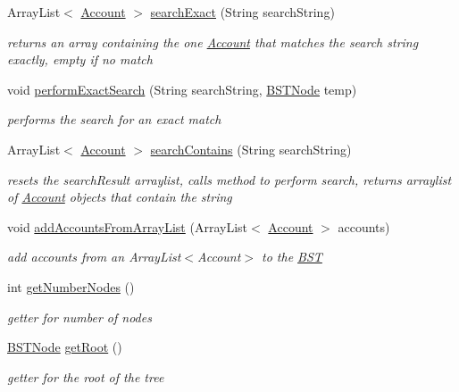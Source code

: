 \begin{DoxyCompactItemize}
Array\+List$<$ \hyperlink{class_account}{Account} $>$ \hyperlink{class_b_s_t_a1474f85085f916fcc3c31ed639467ba6}{search\+Exact} (String search\+String)
\begin{DoxyCompactList}\small\item\em returns an array containing the one \hyperlink{class_account}{Account} that matches the search string exactly, empty if no match \end{DoxyCompactList}\item 
void \hyperlink{class_b_s_t_a2241cab2084ec74baea6feef5cf2df34}{perform\+Exact\+Search} (String search\+String, \hyperlink{class_b_s_t_node}{B\+S\+T\+Node} temp)
\begin{DoxyCompactList}\small\item\em performs the search for an exact match \end{DoxyCompactList}\item 
Array\+List$<$ \hyperlink{class_account}{Account} $>$ \hyperlink{class_b_s_t_a540417596be03377db2b2e86bfa29187}{search\+Contains} (String search\+String)
\begin{DoxyCompactList}\small\item\em resets the search\+Result arraylist, calls method to perform search, returns arraylist of \hyperlink{class_account}{Account} objects that contain the string \end{DoxyCompactList}\item 
void \hyperlink{class_b_s_t_a9bc75db08a0e8fe2bd80f3c5c7c59205}{add\+Accounts\+From\+Array\+List} (Array\+List$<$ \hyperlink{class_account}{Account} $>$ accounts)
\begin{DoxyCompactList}\small\item\em add accounts from an Array\+List$<$\+Account$>$ to the \hyperlink{class_b_s_t}{B\+ST} \end{DoxyCompactList}\item 
int \hyperlink{class_b_s_t_a7efc306d687afb24a2c79bdd15c2e1fd}{get\+Number\+Nodes} ()
\begin{DoxyCompactList}\small\item\em getter for number of nodes \end{DoxyCompactList}\item 
\hyperlink{class_b_s_t_node}{B\+S\+T\+Node} \hyperlink{class_b_s_t_a5d06adaf42f8e1d7f032a1b3be4cd813}{get\+Root} ()
\begin{DoxyCompactList}\small\item\em getter for the root of the tree \end{DoxyCompactList}\end{DoxyCompactItemize}


